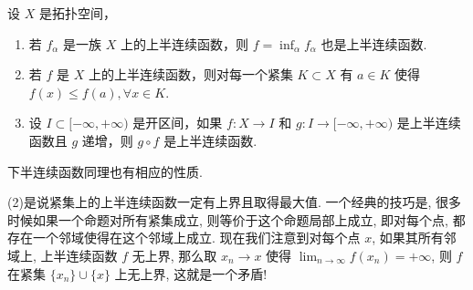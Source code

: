 \documentclass[../../main.tex]{subfiles}%
\begin{document}
\begin{proposition}[上半连续函数基本性质]\label{proposition:半连续函数基本性质}
设 \(X\) 是拓扑空间，
\begin{enumerate}[(1)]
\item 若 \(f_{\alpha}\) 是一族 \(X\) 上的上半连续函数，则 \(f = \inf_{\alpha} f_{\alpha}\) 也是上半连续函数.
\item 若 \(f\) 是 \(X\) 上的上半连续函数，则对每一个紧集 \(K \subset X\) 有 \(a \in K\) 使得 \(f(x) \leqslant  f(a),\forall x \in K\).
\item 设 \(I \subset [-\infty,+\infty)\) 是开区间，如果 \(f: X \to I\) 和 \(g: I \to [-\infty,+\infty)\) 是上半连续函数且 \(g\) 递增，则 \(g \circ f\) 是上半连续函数.
\end{enumerate}
\end{proposition}
\begin{remark}
下半连续函数同理也有相应的性质.
\end{remark}
\begin{note}
(2)是说紧集上的上半连续函数一定有上界且取得最大值. 一个经典的技巧是, 很多时候如果一个命题对所有紧集成立, 则等价于这个命题局部上成立, 即对每个点, 都存在一个邻域使得在这个邻域上成立. 现在我们注意到对每个点 \(x\), 如果其所有邻域上, 上半连续函数 \(f\) 无上界, 那么取 \(x_{n}\to x\) 使得 \(\lim_{n \to \infty}f(x_{n}) = +\infty\), 则 \(f\) 在紧集 \(\{x_{n}\}\cup\{x\}\) 上无上界, 这就是一个矛盾!
\end{note}
\end{document}

